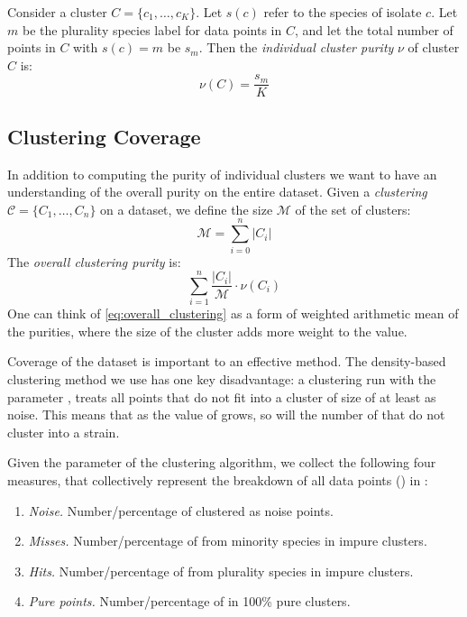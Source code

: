 Consider a cluster $C=\{c_1,\ldots, c_K\}$. Let $s(c)$ refer to the species of isolate $c$.
Let $m$ be the plurality species label for data points in $C$, and let the total number of points in
$C$ with $s(c) = m$ be $s_m$. Then the \textit{individual cluster purity} $\nu$ of cluster $C$ is:
\[
    \nu(C) = \frac{s_m}{K}
\]

\subsection{Clustering Coverage}
In addition to computing the purity of individual clusters we want to have an understanding of the overall purity on the entire dataset.
Given a \textit{clustering} $\mathcal{C} = \{C_1,\dots,C_n\}$ on a dataset, we define the size $\mathcal{M}$ of the set of clusters: 
\begin{equation}\label{eq:num_isols}
\mathcal{M} = \sum_{i = 0}^{n} |C_i|
\end{equation}
The \textit{overall clustering purity} is:
\begin{equation}\label{eq:overall_clustering}
\sum_{i=1}^{n} \frac{|C_i|}{\mathcal{M}}\cdot\nu(C_i)
\end{equation}
One can think of \eqref{eq:overall_clustering} as a form of weighted arithmetic mean of the purities, where the size of the cluster adds more weight to the value.

\label{sec:validation:coverage}
Coverage of the dataset is important to an effective \mst{} method.
The density-based clustering method we use has one key disadvantage: a clustering run  with the parameter \minneigh{}, treats all points that do not fit into a cluster of size  of at least \minneigh{} as noise.
This means that as the value of \minneigh{} grows, so will the number of \isols{} that do not cluster into a strain.

Given the parameter \minneigh{} of the clustering algorithm, we collect the following four measures, that collectively represent the breakdown of all data points (\isols{}) in \cplop{}:
\begin{enumerate}
    \item \textit{Noise.} Number/percentage of \isols{} clustered as noise points.
    \item \textit{Misses.} Number/percentage of \isols{} from  minority species
    in impure clusters.
     \item \textit{Hits.} Number/percentage of \isols{} from plurality species in
     impure clusters.
     \item \textit{Pure points.} Number/percentage of \isols{} in 100\% pure clusters.
\end{enumerate}
